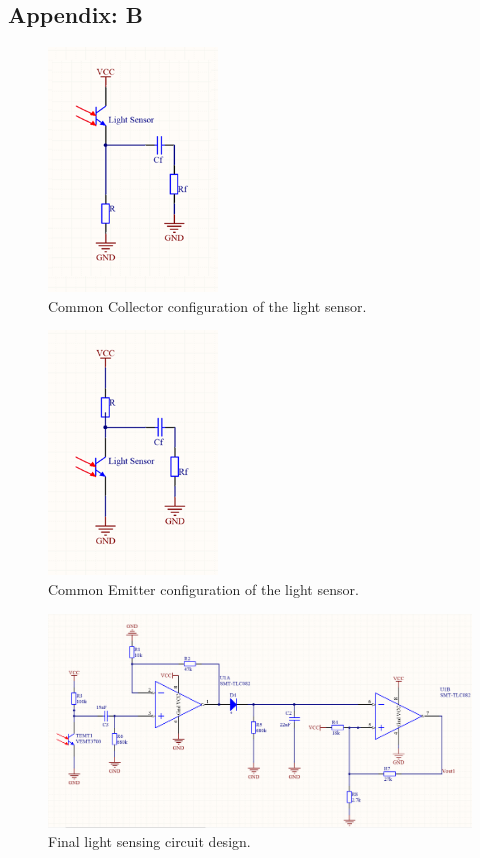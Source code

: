 \subsection*{Appendix: B}
\begin{multicols}{2}

\begin{figure}[H]
\centering
\includegraphics[width=0.4\textwidth]{figures/common-collector}
\caption{Common Collector configuration of the light sensor.}
\end{figure}

\begin{figure}[H]
\centering
\includegraphics[width=0.4\textwidth]{figures/common-emitter.png}
\caption{Common Emitter configuration of the light sensor.}
\end{figure}
\end{multicols}

\begin{figure}[H]
\centering
\includegraphics[width=\textwidth]{figures/full-circuit.png}
\caption{Final light sensing circuit design.}
\end{figure}

